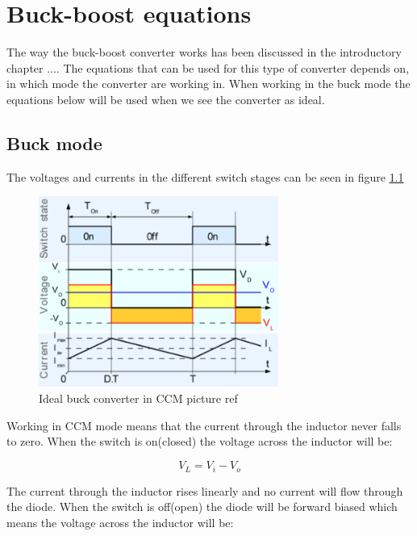 \chapter{Buck-boost equations}\label{ch:Appbuckboost}

The way the buck-boost converter works has been discussed in the introductory chapter .... The equations that can be used for this type of converter depends on, in which mode the converter are working in. When working in the buck mode the equations below will be used when we see the converter as ideal. 

\section{Buck mode}

The voltages and currents in the different switch stages can be seen in figure \ref{CCM_buck}

\begin{figure}[htbp]
	\begin{center}
		\includegraphics[width=0.7\textwidth]{../Pictures/CCM_buck}
		\caption{Ideal buck converter in CCM picture ref}
		\label{CCM_buck}
	\end{center}	
\end{figure}

Working in CCM mode means that the current through the inductor never falls to zero. When the switch is on(closed) the voltage across the inductor will be: 

\begin{equation}
V_L = V_i-V_o
\end{equation} 

The current through the inductor rises linearly and no current will flow through the diode.
When the switch is off(open) the diode will be forward biased which means the voltage across the inductor will be:

